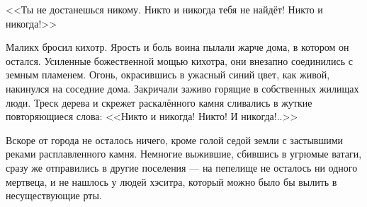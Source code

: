 <<Ты не достанешься никому.
Никто и никогда тебя не найдёт!
Никто и никогда!>>

Маликх бросил кихотр.
Ярость и боль воина пылали жарче дома, в котором он остался.
Усиленные божественной мощью кихотра, они внезапно соединились с земным пламенем.
Огонь, окрасившись в ужасный синий цвет, как живой, накинулся на соседние дома.
Закричали заживо горящие в собственных жилищах люди.
Треск дерева и скрежет раскалённого камня сливались в жуткие повторяющиеся слова: <<Никто и никогда!
Никто!
И никогда!..>>

Вскоре от города не осталось ничего, кроме голой седой земли с застывшими реками расплавленного камня.
Немногие выжившие, сбившись в угрюмые ватаги, сразу же отправились в другие поселения --- на пепелище не осталось ни одного мертвеца, и не нашлось у людей хэситра, который можно было бы вылить в несуществующие рты.


